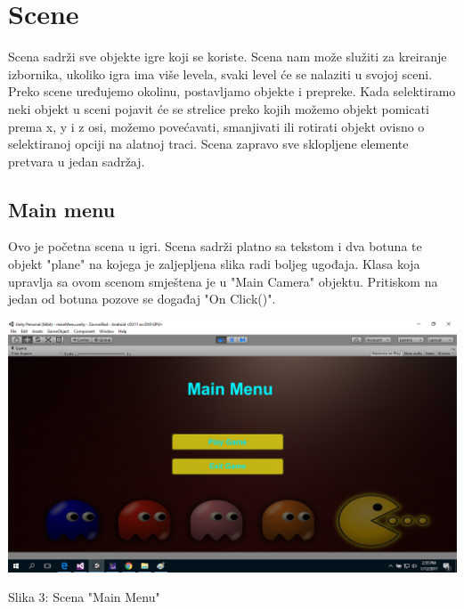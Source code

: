 \section{Scene}

Scena sadrži sve objekte igre koji se koriste. Scena nam može služiti za kreiranje izbornika, ukoliko igra ima više levela, svaki level će se nalaziti u svojoj sceni. Preko scene uređujemo okolinu, postavljamo objekte i prepreke. Kada selektiramo neki objekt u sceni pojavit će se strelice preko kojih možemo objekt pomicati prema x, y i z osi, možemo povećavati, smanjivati ili rotirati objekt ovisno o selektiranoj opciji na alatnoj traci. Scena zapravo sve sklopljene elemente pretvara u jedan sadržaj. 



\subsection{Main menu}
Ovo je početna scena u igri. Scena sadrži platno sa tekstom i dva botuna te objekt "plane" na kojega je zaljepljena slika radi boljeg ugođaja. Klasa koja upravlja sa ovom scenom smještena je u "Main Camera" objektu. Pritiskom na jedan od botuna pozove se događaj "On Click()".

\begin{center}
	\includegraphics[scale=0.35]{scena1.png}
	
	Slika 3: Scena "Main Menu"
\end{center}

\newpage
